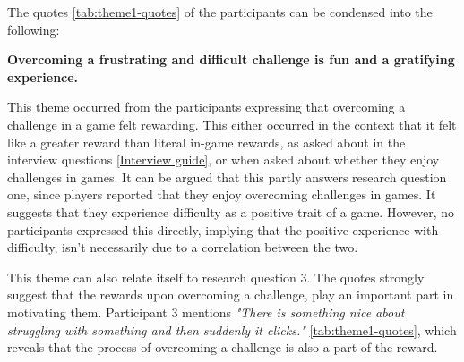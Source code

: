 The quotes \ref{tab:theme1-quotes} of the participants can be condensed into the following:
\begin{center}
    \textbf{Overcoming a frustrating and difficult challenge is fun and a gratifying experience.}
\end{center}

This theme occurred from the participants expressing that overcoming a challenge in a game felt rewarding. This either occurred in the context that it felt like a greater reward than literal in-game rewards, as asked about in the interview questions \ref{Interview guide}, or when asked about whether they enjoy challenges in games. It can be argued that this partly answers research question one, since players reported that they enjoy overcoming challenges in games. It suggests that they experience difficulty as a positive trait of a game. However, no participants expressed this directly, implying that the positive experience with difficulty, isn't necessarily due to a correlation between the two. 

This theme can also relate itself to research question 3. The quotes strongly suggest that the rewards upon overcoming a challenge, play an important part in motivating them. Participant 3 mentions \textit{"There is something nice about struggling with something and then suddenly it clicks."}  \ref{tab:theme1-quotes},  which reveals that the process of overcoming a challenge is also a part of the reward.

